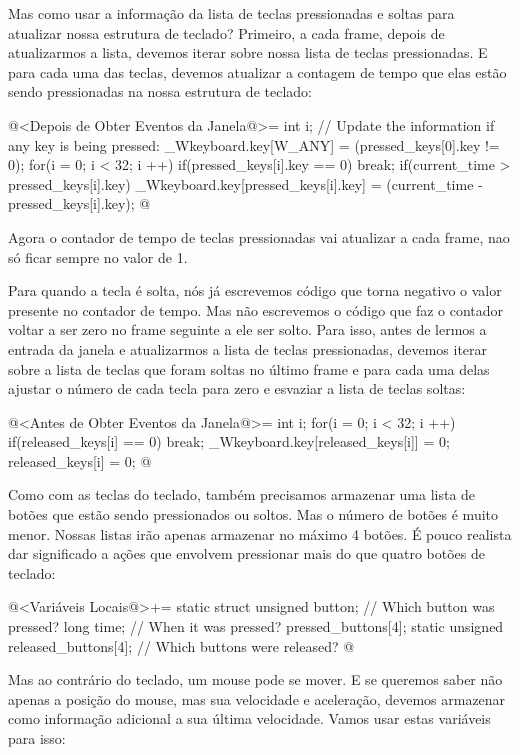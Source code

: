 Mas como usar a informação da lista de teclas pressionadas e soltas
para atualizar nossa estrutura de teclado? Primeiro, a cada frame,
depois de atualizarmos a lista, devemos iterar sobre nossa lista de
teclas pressionadas. E para cada uma das teclas, devemos atualizar a
contagem de tempo que elas estão sendo pressionadas na nossa estrutura
de teclado:

\iniciocodigo
@<Depois de Obter Eventos da Janela@>=
{
  int i;
  // Update the information if any key is being pressed:
  _Wkeyboard.key[W_ANY] = (pressed_keys[0].key != 0);
  for(i = 0; i < 32; i ++){
    if(pressed_keys[i].key == 0)
      break;
    if(current_time > pressed_keys[i].key)
      _Wkeyboard.key[pressed_keys[i].key] = (current_time - pressed_keys[i].key);
  }
}
@
\fimcodigo

Agora o contador de tempo de teclas pressionadas vai atualizar a cada
frame, nao só ficar sempre no valor de 1.

Para quando a tecla é solta, nós já escrevemos código que torna
negativo o valor presente no contador de tempo. Mas não escrevemos o
código que faz o contador voltar a ser zero no frame seguinte a ele
ser solto. Para isso, antes de lermos a entrada da janela e
atualizarmos a lista de teclas pressionadas, devemos iterar sobre a
lista de teclas que foram soltas no último frame e para cada uma
delas ajustar o número de cada tecla para zero e esvaziar a lista de
teclas soltas:

\iniciocodigo
@<Antes de Obter Eventos da Janela@>=
{
  int i;
  for(i = 0; i < 32; i ++){
    if(released_keys[i] == 0)
      break;
    _Wkeyboard.key[released_keys[i]] = 0;
    released_keys[i] = 0;
  }
}
@
\fimcodigo


Como com as teclas do teclado, também precisamos armazenar uma lista
de botões que estão sendo pressionados ou soltos. Mas o número de
botões é muito menor. Nossas listas irão apenas armazenar no máximo 4
botões. É pouco realista dar significado a ações que envolvem
pressionar mais do que quatro botões de teclado:

\iniciocodigo
@<Variáveis Locais@>+=
static struct{
  unsigned button; // Which button was pressed?
  long time;       // When it was pressed?
} pressed_buttons[4];
static unsigned released_buttons[4]; // Which buttons were released?
@
\fimcodigo

Mas ao contrário do teclado, um mouse pode se mover. E se queremos
saber não apenas a posição do mouse, mas sua velocidade e aceleração,
devemos armazenar como informação adicional a sua última
velocidade. Vamos usar estas variáveis para isso:

